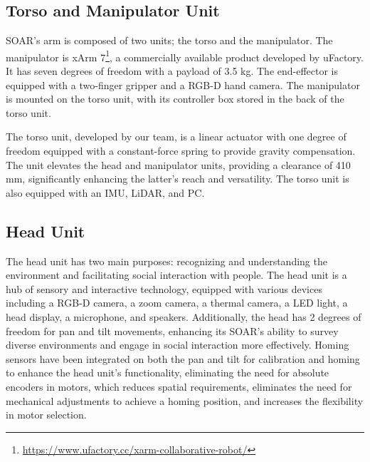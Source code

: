 \documentclass[runningheads,a4paper]{llncs}
\begin{document}
\subsection{Torso and Manipulator Unit}
SOAR’s arm is composed of two units; the torso and the manipulator.
The manipulator is xArm 7\footnote{\url{https://www.ufactory.cc/xarm-collaborative-robot/}}, a commercially available product developed by uFactory.
It has seven degrees of freedom with a payload of 3.5 kg.
The end-effector is equipped with a two-finger gripper and a RGB-D hand camera.
The manipulator is mounted on the torso unit, with its controller box stored in the back of the torso unit.

The torso unit, developed by our team, is a linear actuator with one degree of freedom equipped with a constant-force spring to provide gravity compensation.
The unit elevates the head and manipulator units, providing a clearance of 410 mm, significantly enhancing the latter's reach and versatility.
The torso unit is also equipped with an IMU, LiDAR, and PC.

\subsection{Head Unit}
The head unit has two main purposes: recognizing and understanding the environment and facilitating social interaction with people.
The head unit is a hub of sensory and interactive technology, equipped with various devices including a RGB-D camera, a zoom camera, a thermal camera, a LED light, a head display, a microphone, and speakers.
Additionally, the head has 2 degrees of freedom for pan and tilt movements, enhancing its SOAR’s ability to survey diverse environments and engage in social interaction more effectively.
Homing sensors have been integrated on both the pan and tilt for calibration and homing to enhance the head unit's functionality, eliminating the need for absolute encoders in motors, which reduces spatial requirements, eliminates the need for mechanical adjustments to achieve a homing position, and increases the flexibility in motor selection.

\end{document}
